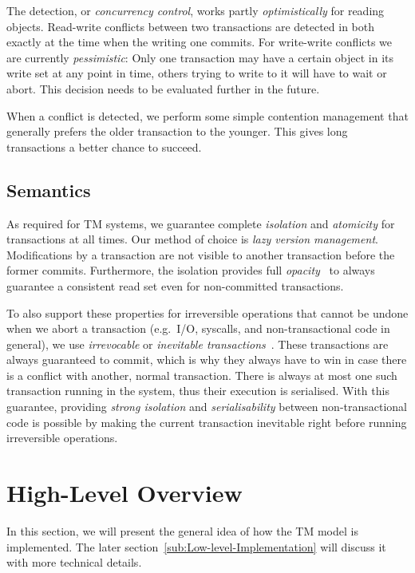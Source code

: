 \documentclass{sigplanconf}
\begin{document}
The detection, or \emph{concurrency control}, works partly
\emph{optimistically} for reading objects. Read-write conflicts
between two transactions are detected in both exactly at the time when
the writing one commits. For write-write conflicts we are currently
\emph{pessimistic}: Only one transaction may have a certain object in
its write set at any point in time, others trying to write to it will
have to wait or abort. This decision needs to be evaluated further
in the future.

When a conflict is detected, we perform some simple contention
management that generally prefers the older transaction to the younger.
This gives long transactions a better chance to succeed.

\subsection{Semantics}

As required for TM systems, we guarantee complete \emph{isolation} and
\emph{atomicity} for transactions at all times. Our method of choice
is \emph{lazy version management}. Modifications by a transaction are
not visible to another transaction before the former commits.
Furthermore, the isolation provides full
\emph{opacity}~\cite{guerraoui08} to always guarantee a consistent
read set even for non-committed transactions.

To also support these properties for irreversible operations that
cannot be undone when we abort a transaction (e.g.\ I/O, syscalls, and
non-transactional code in general), we use \emph{irrevocable} or
\emph{inevitable transactions}~\cite{blundell06,spear08}. These transactions are always
guaranteed to commit, which is why they always have to win in case
there is a conflict with another, normal transaction. There is always
at most one such transaction running in the system, thus their
execution is serialised. With this guarantee, providing \emph{strong
isolation} and \emph{serialisability} between non-transactional code
is possible by making the current transaction inevitable right before
running irreversible operations.



\section{High-Level Overview}

In this section, we will present the general idea of how the TM model is
implemented.  The later section~\ref{sub:Low-level-Implementation} will
discuss it with more technical details.
\end{document}

